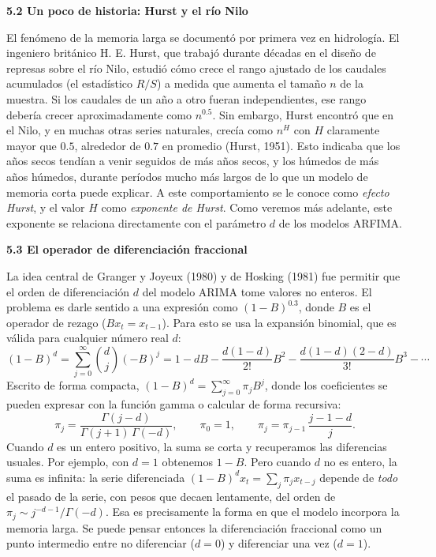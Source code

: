 \documentclass[legalpaper,11pt]{article}
\begin{document}
\begin{enumerate}
\medskip
\noindent\textbf{5.2 Un poco de historia: Hurst y el r\'io Nilo}

El fen\'omeno de la memoria larga se document\'o por primera vez en hidrolog\'ia. El ingeniero brit\'anico H. E. Hurst, que trabaj\'o durante d\'ecadas en el dise\~no de represas sobre el r\'io Nilo, estudi\'o c\'omo crece el rango ajustado de los caudales acumulados (el estad\'istico $R/S$) a medida que aumenta el tama\~no $n$ de la muestra. Si los caudales de un a\~no a otro fueran independientes, ese rango deber\'ia crecer aproximadamente como $n^{0.5}$. Sin embargo, Hurst encontr\'o que en el Nilo, y en muchas otras series naturales, crec\'ia como $n^{H}$ con $H$ claramente mayor que $0.5$, alrededor de $0.7$ en promedio (Hurst, 1951). Esto indicaba que los a\~nos secos tend\'ian a venir seguidos de m\'as a\~nos secos, y los h\'umedos de m\'as a\~nos h\'umedos, durante per\'iodos mucho m\'as largos de lo que un modelo de memoria corta puede explicar. A este comportamiento se le conoce como \emph{efecto Hurst}, y el valor $H$ como \emph{exponente de Hurst}. Como veremos m\'as adelante, este exponente se relaciona directamente con el par\'ametro $d$ de los modelos ARFIMA.

\medskip
\noindent\textbf{5.3 El operador de diferenciaci\'on fraccional}

La idea central de Granger y Joyeux (1980) y de Hosking (1981) fue permitir que el orden de diferenciaci\'on $d$ del modelo ARIMA tome valores no enteros. El problema es darle sentido a una expresi\'on como $(1-B)^{0.3}$, donde $B$ es el operador de rezago ($Bx_t = x_{t-1}$). Para esto se usa la expansi\'on binomial, que es v\'alida para cualquier n\'umero real $d$:
\begin{equation}
(1-B)^{d} = \sum_{j=0}^{\infty} \binom{d}{j} (-B)^{j} = 1 - dB - \frac{d(1-d)}{2!}B^{2} - \frac{d(1-d)(2-d)}{3!}B^{3} - \cdots
\end{equation}
Escrito de forma compacta, $(1-B)^{d} = \sum_{j=0}^{\infty} \pi_j B^{j}$, donde los coeficientes se pueden expresar con la funci\'on gamma o calcular de forma recursiva:
\begin{equation}
\pi_j = \frac{\Gamma(j-d)}{\Gamma(j+1)\,\Gamma(-d)}, \qquad \pi_0 = 1, \qquad \pi_j = \pi_{j-1}\,\frac{j-1-d}{j}.
\end{equation}
Cuando $d$ es un entero positivo, la suma se corta y recuperamos las diferencias usuales. Por ejemplo, con $d=1$ obtenemos $1 - B$. Pero cuando $d$ no es entero, la suma es infinita: la serie diferenciada $(1-B)^{d}x_t = \sum_{j} \pi_j x_{t-j}$ depende de \emph{todo} el pasado de la serie, con pesos que decaen lentamente, del orden de $\pi_j \sim j^{-d-1}/\Gamma(-d)$. Esa es precisamente la forma en que el modelo incorpora la memoria larga. Se puede pensar entonces la diferenciaci\'on fraccional como un punto intermedio entre no diferenciar ($d=0$) y diferenciar una vez ($d=1$).


\end{enumerate}
\end{document}
